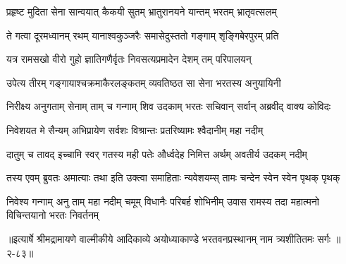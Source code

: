 \twolineshloka
{प्रहृष्ट मुदिता सेना सान्वयात् कैकयी सुतम्}
{भ्रातुरानयने यान्तम् भरतम् भ्रातृवत्सलम्} %

\twolineshloka
{ते गत्वा दूरमध्वानम् रथम् यानाश्वकुञ्जरैः}
{समासेदुस्ततो गङ्गाम् शृङ्गिबेरपुरम् प्रति} %

\twolineshloka
{यत्र रामसखो वीरो गुहो ज्ञातिगणैर्वृतः}
{निवसत्यप्रमादेन देशम् तम् परिपालयन्} %

\twolineshloka
{उपेत्य तीरम् गङ्गायाश्चक्रमाकैरलङ्कतम्}
{व्यवतिष्ठत सा सेना भरतस्य अनुयायिनी} %

\twolineshloka
{निरीक्ष्य अनुगताम् सेनाम् ताम् च गन्गाम् शिव उदकाम्}
{भरतः सचिवान् सर्वान् अब्रवीद् वाक्य कोविदः} %

\twolineshloka
{निवेशयत मे सैन्यम् अभिप्रायेण सर्वशः}
{विश्रान्तः प्रतरिष्यामः श्वैदानीम् महा नदीम्} %

\twolineshloka
{दातुम् च तावद् इच्चामि स्वर् गतस्य मही पतेः}
{और्ध्वदेह निमित्त अर्थम् अवतीर्य उदकम् नदीम्} %

\twolineshloka
{तस्य एवम् ब्रुवतः अमात्याः तथा इति उक्त्वा समाहिताः}
{न्यवेशयम्स् तामः चन्देन स्वेन स्वेन पृथक् पृथक्} %

\fourlineindentedshloka
{निवेश्य गन्गाम् अनु ताम् महा नदीम्}
{चमूम् विधानैः परिबर्ह शोभिनीम्}
{उवास रामस्य तदा महात्मनो}
{विचिन्तयानो भरतः निवर्तनम्} %


॥इत्यार्षे श्रीमद्रामायणे वाल्मीकीये आदिकाव्ये अयोध्याकाण्डे भरतवनप्रस्थानम् नाम त्र्यशीतितमः सर्गः ॥२-८३॥
